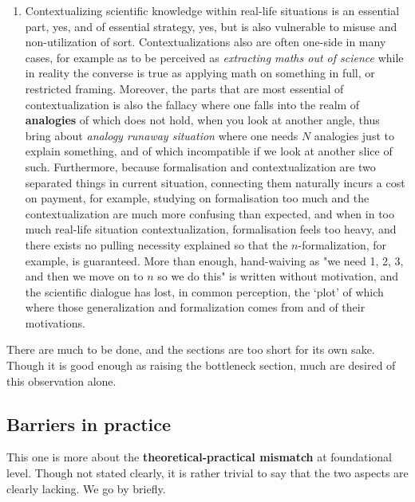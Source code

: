 \documentclass[10pt,a4paper]{article}
\begin{document}
\begin{enumerate}
    \item Contextualizing scientific knowledge within real-life situations is an essential part, yes, and of essential strategy, yes, but is also vulnerable to misuse and non-utilization of sort. Contextualizations also are often one-side in many cases, for example as to be perceived as \textit{extracting maths out of science} while in reality the converse is true as applying math on something in full, or restricted framing. Moreover, the parts that are most essential of contextualization is also the fallacy where one falls into the realm of \textbf{analogies} of which does not hold, when you look at another angle, thus bring about \textit{analogy runaway situation} where one needs $N$ analogies just to explain something, and of which incompatible if we look at another slice of such. Furthermore, because formalisation and contextualization are two separated things in current situation, connecting them naturally incurs a cost on payment, for example, studying on formalisation too much and the contextualization are much more confusing than expected, and when in too much real-life situation contextualization, formalisation feels too heavy, and there exists no pulling necessity explained so that the $n$-formalization, for example, is guaranteed. More than enough, hand-waiving as "we need 1, 2, 3, and then we move on to $n$ so we do this" is written without motivation, and the scientific dialogue has lost, in common perception, the `plot' of which where those generalization and formalization comes from and of their motivations. 
\end{enumerate}

There are much to be done, and the sections are too short for its own sake. Though it is good enough as raising the bottleneck section, much are desired of this observation alone. 

\subsection{Barriers in practice}

This one is more about the \textbf{theoretical-practical mismatch} at foundational level. Though not stated clearly, it is rather trivial to say that the two aspects are clearly lacking. We go by briefly. 
\end{document}
